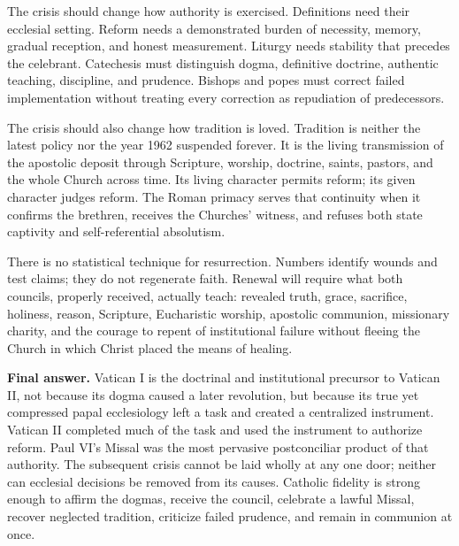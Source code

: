The crisis should change how authority is exercised. Definitions need their ecclesial setting. Reform needs a demonstrated burden of necessity, memory, gradual reception, and honest measurement. Liturgy needs stability that precedes the celebrant. Catechesis must distinguish dogma, definitive doctrine, authentic teaching, discipline, and prudence. Bishops and popes must correct failed implementation without treating every correction as repudiation of predecessors.

The crisis should also change how tradition is loved. Tradition is neither the latest policy nor the year 1962 suspended forever. It is the living transmission of the apostolic deposit through Scripture, worship, doctrine, saints, pastors, and the whole Church across time. Its living character permits reform; its given character judges reform. The Roman primacy serves that continuity when it confirms the brethren, receives the Churches' witness, and refuses both state captivity and self-referential absolutism.

There is no statistical technique for resurrection. Numbers identify wounds and test claims; they do not regenerate faith. Renewal will require what both councils, properly received, actually teach: revealed truth, grace, sacrifice, holiness, reason, Scripture, Eucharistic worship, apostolic communion, missionary charity, and the courage to repent of institutional failure without fleeing the Church in which Christ placed the means of healing.

\begin{studyframe}
\textbf{Final answer.} Vatican I is the doctrinal and institutional precursor to Vatican II, not because its dogma caused a later revolution, but because its true yet compressed papal ecclesiology left a task and created a centralized instrument. Vatican II completed much of the task and used the instrument to authorize reform. Paul VI's Missal was the most pervasive postconciliar product of that authority. The subsequent crisis cannot be laid wholly at any one door; neither can ecclesial decisions be removed from its causes. Catholic fidelity is strong enough to affirm the dogmas, receive the council, celebrate a lawful Missal, recover neglected tradition, criticize failed prudence, and remain in communion at once.
\end{studyframe}
